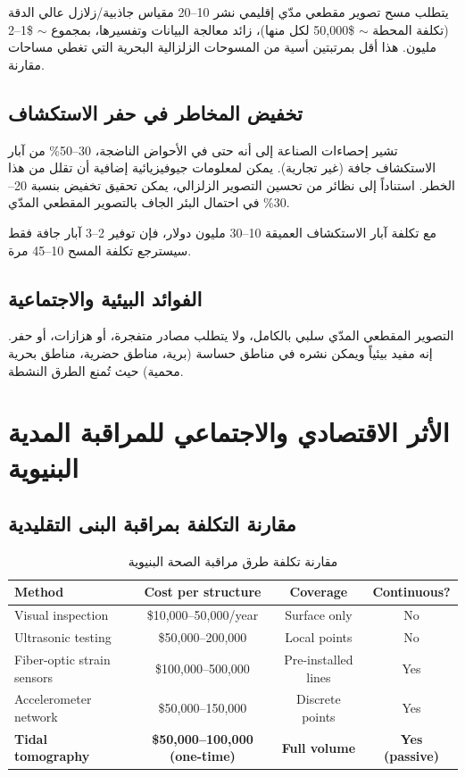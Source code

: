 \documentclass[12pt,a4paper]{article}
\theoremstyle{remark}
\begin{document}
	يتطلب مسح تصوير مقطعي مدّي إقليمي نشر 10–20 مقياس جاذبية/زلازل عالي الدقة (تكلفة المحطة \(\sim\) \$50,000 لكل منها)، زائد معالجة البيانات وتفسيرها، بمجموع \(\sim\) \$1–2 مليون. هذا أقل بمرتبتين أسية من المسوحات الزلزالية البحرية التي تغطي مساحات مقارنة.
	
	\subsection{تخفيض المخاطر في حفر الاستكشاف}
	
	تشير إحصاءات الصناعة إلى أنه حتى في الأحواض الناضجة، 30–50\% من آبار الاستكشاف جافة (غير تجارية). يمكن لمعلومات جيوفيزيائية إضافية أن تقلل من هذا الخطر. استناداً إلى نظائر من تحسين التصوير الزلزالي، يمكن تحقيق تخفيض بنسبة 20–30\% في احتمال البئر الجاف بالتصوير المقطعي المدّي.
	
	مع تكلفة آبار الاستكشاف العميقة 10–30 مليون دولار، فإن توفير 2–3 آبار جافة فقط سيسترجع تكلفة المسح 10–45 مرة.
	
	\subsection{الفوائد البيئية والاجتماعية}
	
	التصوير المقطعي المدّي سلبي بالكامل، ولا يتطلب مصادر متفجرة، أو هزازات، أو حفر. إنه مفيد بيئياً ويمكن نشره في مناطق حساسة (برية، مناطق حضرية، مناطق بحرية محمية) حيث تُمنع الطرق النشطة.
	
	\section{الأثر الاقتصادي والاجتماعي للمراقبة المدية البنيوية}
	\label{sec:structural-economics}
	
	\subsection{مقارنة التكلفة بمراقبة البنى التقليدية}
	
	\begin{otherlanguage}{english}
		\begin{table}[htbp]
			\centering
			\caption{مقارنة تكلفة طرق مراقبة الصحة البنيوية}
			\label{tab:structural-costs}
			\small
			\begin{tabular}{lccc}
				\toprule
				\textbf{Method} & \textbf{Cost per structure} & \textbf{Coverage} & \textbf{Continuous?} \\
				\midrule
				Visual inspection & \$10,000–50,000/year & Surface only & No \\
				Ultrasonic testing & \$50,000–200,000 & Local points & No \\
				Fiber-optic strain sensors & \$100,000–500,000 & Pre-installed lines & Yes \\
				Accelerometer network & \$50,000–150,000 & Discrete points & Yes \\
				\textbf{Tidal tomography} & \textbf{\$50,000–100,000 (one-time)} & \textbf{Full volume} & \textbf{Yes (passive)} \\
				\bottomrule
			\end{tabular}
		\end{table}
	\end{otherlanguage}
	
\end{document}
